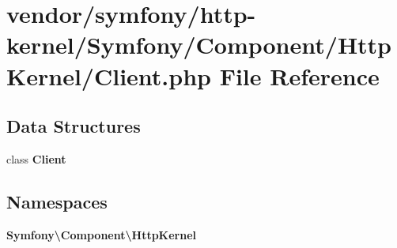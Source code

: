 \section{vendor/symfony/http-\/kernel/\+Symfony/\+Component/\+Http\+Kernel/\+Client.php File Reference}
\label{_client_8php}
\subsection*{Data Structures}
\begin{DoxyCompactItemize}
\item 
class {\bf Client}
\end{DoxyCompactItemize}
\subsection*{Namespaces}
\begin{DoxyCompactItemize}
\item 
 {\bf Symfony\textbackslash{}\+Component\textbackslash{}\+Http\+Kernel}
\end{DoxyCompactItemize}
